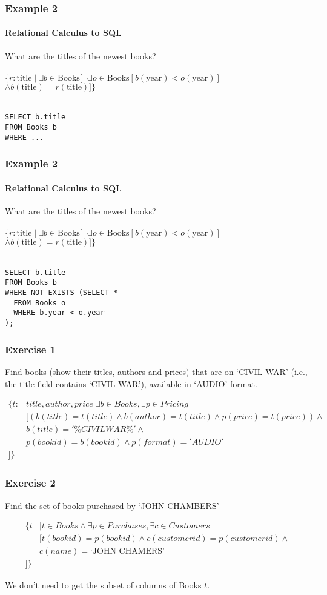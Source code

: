 \documentclass{beamer}
\begin{document}
\begin{frame}[fragile]
  \frametitle{Example 2}
    \framesubtitle{Relational Calculus to SQL}
  What are the titles of the newest books?\\
  \hfill \\
  $\{r:\text{title} \mid \exists b \in \text{Books} [ \neg\exists o \in \text{Books} [ b(\text{year}) < o(\text{year})]$\\
  $\land b(\text{title}) = r(\text{title})] \}$\\
  \hfill \\
\begin{lstlisting}
SELECT b.title
FROM Books b
WHERE ...
\end{lstlisting}
\end{frame}

\begin{frame}[fragile]
  \frametitle{Example 2}
    \framesubtitle{Relational Calculus to SQL}
  What are the titles of the newest books?\\
  \hfill \\
  $\{r:\text{title} \mid \exists b \in \text{Books} [ \neg\exists o \in \text{Books} [ b(\text{year}) < o(\text{year})]$\\
  $\land b(\text{title}) = r(\text{title})] \}$\\
  \hfill \\
\begin{lstlisting}
SELECT b.title
FROM Books b
WHERE NOT EXISTS (SELECT *
  FROM Books o
  WHERE b.year < o.year
);
\end{lstlisting}
\end{frame}


\begin{frame}[fragile]
  \frametitle{Exercise 1}
  Find books (show their titles, authors and prices) that are on `CIVIL WAR' (i.e., the title field contains `CIVIL WAR'), available in `AUDIO' format. 

\begin{align*}
\{t: &title, author, price| \exists b \in Books, \exists p \in Pricing \\
&[(b(title)=t(title)\wedge b(author)=t(title) \wedge p(price)=t(price)) \wedge \\
& b(title)='\%CIVIL WAR\%' \wedge \\
& p(bookid)=b(bookid) \wedge p(format)='AUDIO'\\
]\}
\end{align*}
\end{frame}

\begin{frame}[fragile]
\frametitle{Exercise 2}
Find the set of books purchased by  `JOHN CHAMBERS'

\begin{align*}
\{t&|t\in Books\wedge \exists p \in Purchases, \exists c \in Customers \\
&[t(bookid)=p(bookid) \wedge c(customerid)=p(customerid) \wedge \\
&c(name)=\text{`JOHN CHAMERS'}\\
]\}
\end{align*}

We don't need to get the subset of columns of Books $t$. 
\end{frame}
\end{document}
